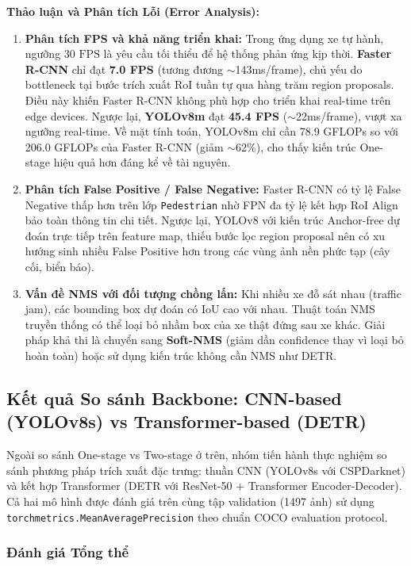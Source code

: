 \documentclass[a4paper]{article}
\theoremstyle{definition}
\begin{document}
\textbf{Thảo luận và Phân tích Lỗi (Error Analysis):}

\begin{enumerate}
	\item \textbf{Phân tích FPS và khả năng triển khai:} Trong ứng dụng xe tự hành, ngưỡng $30\text{ FPS}$ là yêu cầu tối thiểu để hệ thống phản ứng kịp thời. \textbf{Faster R-CNN} chỉ đạt \textbf{7.0 FPS} (tương đương $\sim$143ms/frame), chủ yếu do bottleneck tại bước trích xuất RoI tuần tự qua hàng trăm region proposals. Điều này khiến Faster R-CNN không phù hợp cho triển khai real-time trên edge devices. Ngược lại, \textbf{YOLOv8m} đạt \textbf{45.4 FPS} ($\sim$22ms/frame), vượt xa ngưỡng real-time. Về mặt tính toán, YOLOv8m chỉ cần 78.9 GFLOPs so với 206.0 GFLOPs của Faster R-CNN (giảm $\sim$62\%), cho thấy kiến trúc One-stage hiệu quả hơn đáng kể về tài nguyên.
	\item \textbf{Phân tích False Positive / False Negative:} Faster R-CNN có tỷ lệ False Negative thấp hơn trên lớp \texttt{Pedestrian} nhờ FPN đa tỷ lệ kết hợp RoI Align bảo toàn thông tin chi tiết. Ngược lại, YOLOv8 với kiến trúc Anchor-free dự đoán trực tiếp trên feature map, thiếu bước lọc region proposal nên có xu hướng sinh nhiều False Positive hơn trong các vùng ảnh nền phức tạp (cây cối, biển báo).
	\item \textbf{Vấn đề NMS với đối tượng chồng lấn:} Khi nhiều xe đỗ sát nhau (traffic jam), các bounding box dự đoán có IoU cao với nhau. Thuật toán NMS truyền thống có thể loại bỏ nhầm box của xe thật đứng sau xe khác. Giải pháp khả thi là chuyển sang \textbf{Soft-NMS} \cite{softnms} (giảm dần confidence thay vì loại bỏ hoàn toàn) hoặc sử dụng kiến trúc không cần NMS như DETR.
\end{enumerate}

\subsection{Kết quả So sánh Backbone: CNN-based (YOLOv8s) vs Transformer-based (DETR)}

Ngoài so sánh One-stage vs Two-stage ở trên, nhóm tiến hành thực nghiệm so sánh phương pháp trích xuất đặc trưng: thuần CNN (YOLOv8s với CSPDarknet) và kết hợp Transformer (DETR với ResNet-50 + Transformer Encoder-Decoder). Cả hai mô hình được đánh giá trên cùng tập validation (1497 ảnh) sử dụng \texttt{torchmetrics.MeanAveragePrecision} theo chuẩn COCO evaluation protocol.

\subsubsection{Đánh giá Tổng thể}
\end{document}
